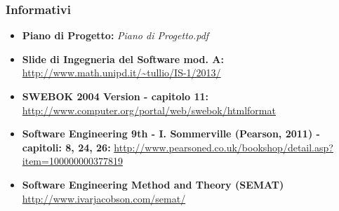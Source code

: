 	\subsubsection{Informativi}
		\begin{itemize}
  			\item \textbf{Piano di Progetto:} \emph{Piano di Progetto.pdf}
  			\item \textbf{Slide di Ingegneria del Software mod. A:} \url{http://www.math.unipd.it/~tullio/IS-1/2013/}
  			\item \textbf{SWEBOK 2004 Version - capitolo 11:} \url{http://www.computer.org/portal/web/swebok/htmlformat} 
  			\item \textbf{Software Engineering 9th - I. Sommerville (Pearson, 2011) - capitoli: 8, 24, 26:} \url{http://www.pearsoned.co.uk/bookshop/detail.asp?item=100000000377819}
  			\item \textbf{Software Engineering Method and Theory (SEMAT)} \url{http://www.ivarjacobson.com/semat/}
		\end{itemize}
		

